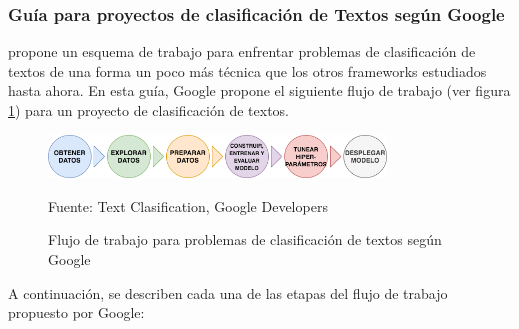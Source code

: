 \subsubsection{Guía para proyectos de clasificación de Textos según Google}
    \cite{Google} propone un esquema de trabajo para enfrentar problemas de clasificación de textos de una forma un poco más técnica que los otros frameworks  estudiados hasta ahora. En esta guía, Google propone el siguiente flujo de trabajo (ver figura \ref{fig:Workflow_Google}) para un proyecto de clasificación de textos.
    \begin{figure}[h]
        \centering
        \includegraphics[width=0.8\textwidth]{figures/Workflow_Google.png}
        \caption{\label{fig:Workflow_Google} Flujo de trabajo para problemas de clasificación de textos según Google} Fuente: Text Clasification, Google Developers \cite{Google}
    \end{figure}
    A continuación, se describen cada una de las etapas del flujo de trabajo propuesto por Google:
